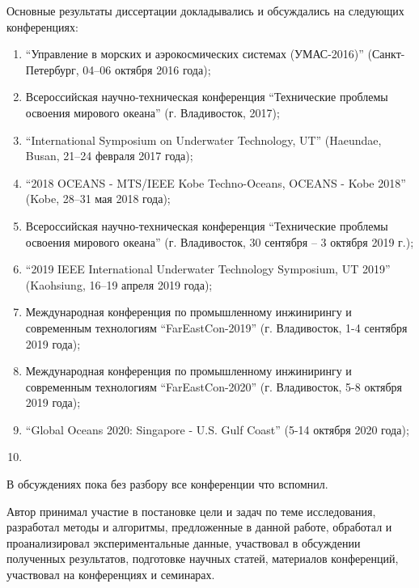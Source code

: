 {\probation}
Основные результаты диссертации
докладывались и обсуждались на следующих конференциях:
\begin{enumerate}
    \item ``Управление в морских и аэрокосмических системах (УМАС-2016)'' (Санкт-Петербург, 04–06 октября 2016 года);
    \item Всероссийская научно-техническая конференция ``Технические проблемы освоения мирового океана'' (г. Владивосток, 2017);
    \item ``International Symposium on Underwater Technology, UT'' (Haeundae, Busan, 21–24 февраля 2017 года);
    \item ``2018 OCEANS - MTS/IEEE Kobe Techno-Oceans, OCEANS - Kobe 2018'' (Kobe, 28–31 мая 2018 года);
    \item Всероссийская научно-техническая конференция ``Технические проблемы освоения мирового океана'' (г. Владивосток, 30 сентября – 3 октября 2019 г.);
    \item ``2019 IEEE International Underwater Technology Symposium, UT 2019'' (Kaohsiung, 16–19 апреля 2019 года);
    \item Международная конференция по промышленному инжинирингу и современным технологиям ``FarEastCon-2019'' (г. Владивосток, 1-4 сентября 2019 года);
    \item Международная конференция по промышленному инжинирингу и современным технологиям ``FarEastCon-2020'' (г. Владивосток, 5-8 октября 2019 года);
    \item ``Global Oceans 2020: Singapore - U.S. Gulf Coast'' (5-14 октября 2020 года);
    \item 
\end{enumerate}
\begin{noteplan}
    В обсуждениях пока без разбору все конференции что вспомнил.
\end{noteplan}

{\contribution} Автор принимал участие в постановке цели и задач по теме исследования, разработал методы и алгоритмы, предложенные в данной работе, обработал и проанализировал экспериментальные данные, участвовал в обсуждении полученных результатов, подготовке научных статей, материалов конференций, участвовал на конференциях и семинарах.

